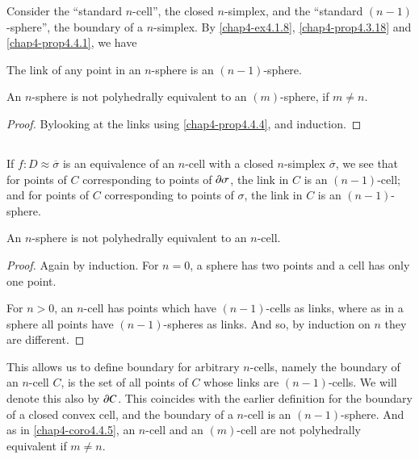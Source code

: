 Consider the ``standard $n$-cell'', the closed $n$-simplex, and the ``standard $(n-1)$-sphere'', the boundary of a $n$-simplex. By \ref{chap4-ex4.1.8}, \ref{chap4-prop4.3.18} and \ref{chap4-prop4.4.1}, we have

\begin{proposition}\label{chap4-prop4.4.4}
The link of any point in an $n$-sphere is an $(n-1)$-sphere.
\end{proposition}

\begin{corollary}\label{chap4-coro4.4.5}
An $n$-sphere is not polyhedrally equivalent to an $(m)$-sphere, if $m\neq n$. 
\end{corollary}

\begin{proof}
By\pageoriginale looking at the links using \ref{chap4-prop4.4.4}, and induction.
\end{proof}

\setcounter{subsection}{5}
\subsection{}\label{chap4-sec4.4.6}
If $f:D\approx \overline{\sigma}$ is an equivalence of an $n$-cell with a closed $n$-simplex $\overline{\sigma}$, we see that for points of $C$ corresponding to points of $\partial \sigma$, the link in $C$ is an $(n-1)$-cell; and for points of $C$ corresponding to points of $\sigma$, the link in $C$ is an $(n-1)$-sphere.

\setcounter{proposition}{6}
\begin{proposition}\label{chap4-prop4.4.7}
An $n$-sphere is not polyhedrally equivalent to an $n$-cell.
\end{proposition}

\begin{proof}
Again by induction. For $n=0$, a sphere has two points and a cell has only one point.

For $n>0$, an $n$-cell has points which have $(n-1)$-cells as links, where as in a sphere all points have $(n-1)$-spheres as links. And so, by induction on $n$ they are different.
\end{proof}

This allows us to define boundary for arbitrary $n$-cells, namely the boundary of an $n$-cell $C$, is the set of all points of $C$ whose links are $(n-1)$-cells. We will denote this also by $\partial C$. This coincides with the earlier definition for the boundary of a closed convex cell, and the boundary of a $n$-cell is an $(n-1)$-sphere. And as in \ref{chap4-coro4.4.5}, an $n$-cell and an $(m)$-cell are not polyhedrally equivalent if $m\neq n$.

